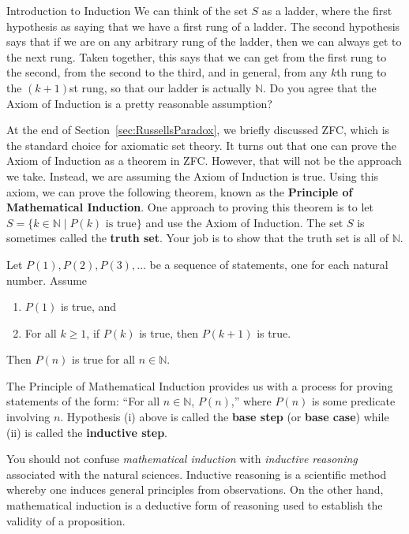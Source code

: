 \begin{section}{Introduction to Induction}
We can think of the set $S$ as a ladder, where the first hypothesis as saying that we have a first rung of a ladder.  The second hypothesis says that if we are on any arbitrary rung of the ladder, then we can always get to the next rung.  Taken together, this says that we can get from the first rung to the second, from the second to the third, and in general, from any $k$th rung to the $(k+1)$st rung, so that our ladder is actually $\mathbb{N}$. Do you agree that the Axiom of Induction is a pretty reasonable assumption?

At the end of Section~\ref{sec:RussellsParadox}, we briefly discussed ZFC, which is the standard choice for axiomatic set theory. It turns out that one can prove the Axiom of Induction as a theorem in ZFC.  However, that will not be the approach we take.  Instead, we are assuming the Axiom of Induction is true. Using this axiom, we can prove the following theorem, known as the \textbf{Principle of Mathematical Induction}. One approach to proving this theorem is to let $S=\{k\in \mathbb{N}\mid P(k) \text{ is true}\}$ and use the Axiom of Induction.  The set $S$ is sometimes called the \textbf{truth set}.  Your job is to show that the truth set is all of $\mathbb{N}$.

\begin{theorem}\label{thm:PMI}
Let $P(1), P(2), P(3), \ldots$ be a sequence of statements, one for each natural number. Assume
\begin{enumerate}[label=\textrm{(\roman*)}]
\item $P(1)$ is true, and
\item For all $k\geq 1$, if $P(k)$ is true, then $P(k+1)$ is true.
\end{enumerate}
Then $P(n)$ is true for all $n\in\mathbb{N}$.
\end{theorem}

The Principle of Mathematical Induction provides us with a process for proving statements of the form: ``For all $n\in\mathbb{N}$, $P(n)$,'' where $P(n)$ is some predicate involving $n$.  Hypothesis (i) above is called the \textbf{base step} (or \textbf{base case}) while (ii) is called the \textbf{inductive step}.

You should not confuse \emph{mathematical induction} with \emph{inductive reasoning} associated with the natural sciences. Inductive reasoning is a scientific method whereby one induces general principles from observations. On the other hand, mathematical induction is a deductive form of reasoning used to establish the validity of a proposition.


\end{section}
